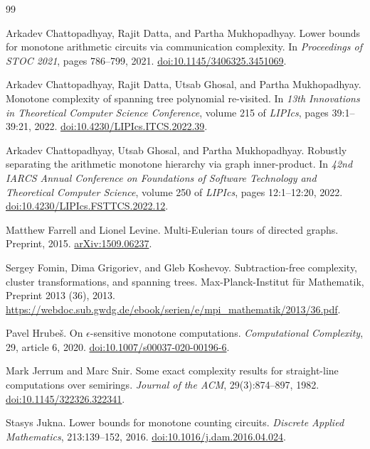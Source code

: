 \documentclass[11pt]{article}
\theoremstyle{definition}
\theoremstyle{remark}
\numberwithin{equation}{section}
\begin{document}
\begin{thebibliography}{99}
\small
\raggedright

Arkadev Chattopadhyay, Rajit Datta, and Partha Mukhopadhyay.
Lower bounds for monotone arithmetic circuits via communication complexity.
In \emph{Proceedings of STOC 2021}, pages 786--799, 2021.
\href{https://doi.org/10.1145/3406325.3451069}{doi:10.1145/3406325.3451069}.

Arkadev Chattopadhyay, Rajit Datta, Utsab Ghosal, and Partha Mukhopadhyay.
Monotone complexity of spanning tree polynomial re-visited.
In \emph{13th Innovations in Theoretical Computer Science Conference},
volume 215 of \emph{LIPIcs}, pages 39:1--39:21, 2022.
\href{https://doi.org/10.4230/LIPIcs.ITCS.2022.39}{doi:10.4230/LIPIcs.ITCS.2022.39}.

Arkadev Chattopadhyay, Utsab Ghosal, and Partha Mukhopadhyay.
Robustly separating the arithmetic monotone hierarchy via graph inner-product.
In \emph{42nd IARCS Annual Conference on Foundations of Software
Technology and Theoretical Computer Science},
volume 250 of \emph{LIPIcs}, pages 12:1--12:20, 2022.
\href{https://doi.org/10.4230/LIPIcs.FSTTCS.2022.12}{doi:10.4230/LIPIcs.FSTTCS.2022.12}.

Matthew Farrell and Lionel Levine.
Multi-Eulerian tours of directed graphs.
Preprint, 2015.
\href{https://arxiv.org/abs/1509.06237}{arXiv:1509.06237}.

Sergey Fomin, Dima Grigoriev, and Gleb Koshevoy.
Subtraction-free complexity, cluster transformations, and spanning trees.
Max-Planck-Institut f\"ur Mathematik, Preprint 2013 (36), 2013.
\url{https://webdoc.sub.gwdg.de/ebook/serien/e/mpi_mathematik/2013/36.pdf}.

Pavel Hrube\v{s}.
On \(\epsilon\)-sensitive monotone computations.
\emph{Computational Complexity}, 29, article 6, 2020.
\href{https://doi.org/10.1007/s00037-020-00196-6}{doi:10.1007/s00037-020-00196-6}.

Mark Jerrum and Marc Snir.
Some exact complexity results for straight-line computations over semirings.
\emph{Journal of the ACM}, 29(3):874--897, 1982.
\href{https://doi.org/10.1145/322326.322341}{doi:10.1145/322326.322341}.

Stasys Jukna.
Lower bounds for monotone counting circuits.
\emph{Discrete Applied Mathematics}, 213:139--152, 2016.
\href{https://doi.org/10.1016/j.dam.2016.04.024}{doi:10.1016/j.dam.2016.04.024}.


\end{thebibliography}
\end{document}
